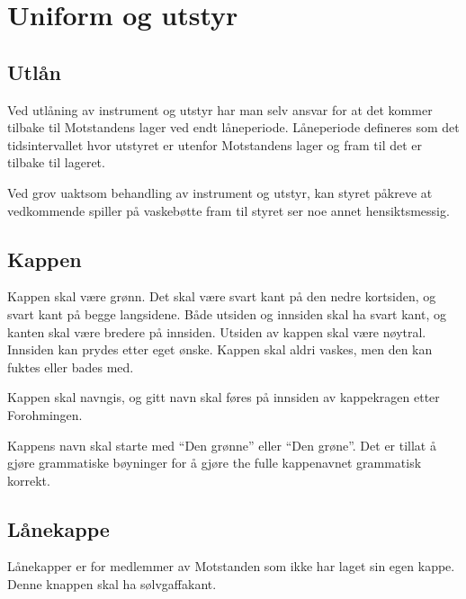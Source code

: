 \section{Uniform og utstyr}
    \subsection{Utlån}
        \begin{statute}
            Ved utlåning av instrument og utstyr har man selv ansvar for at det kommer tilbake til Motstandens lager ved endt låneperiode. Låneperiode defineres som det tidsintervallet hvor utstyret er utenfor Motstandens lager og fram til det er tilbake til lageret.
        \end{statute}
        \begin{statute}
            Ved grov uaktsom behandling av instrument og utstyr, kan styret påkreve at vedkommende spiller på vaskebøtte fram til styret ser noe annet hensiktsmessig. 
        \end{statute}

    \subsection{Kappen}
        \begin{statute}
            Kappen skal være grønn. Det skal være svart kant på den nedre kortsiden, og svart kant på begge langsidene. Både utsiden og innsiden skal ha svart kant, og kanten skal være bredere på innsiden. Utsiden av kappen skal være nøytral. Innsiden kan prydes etter eget ønske. Kappen skal aldri vaskes, men den kan fuktes eller bades med.
        \end{statute}
        \begin{statute}
            Kappen skal navngis, og gitt navn skal føres på innsiden av kappekragen etter Forohmingen.
        \end{statute}
        \begin{statute}
            Kappens navn skal starte med \enquote{Den grønne} eller \enquote{Den grøne}. Det er tillat å gjøre grammatiske bøyninger for å gjøre the fulle kappenavnet grammatisk korrekt.
        \end{statute}

    \subsection{Lånekappe}
        \begin{statute}
            Lånekapper er for medlemmer av Motstanden som ikke har laget sin egen kappe. Denne knappen skal ha sølvgaffakant.
        \end{statute}

